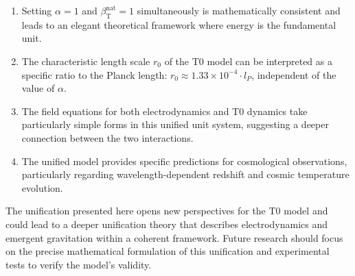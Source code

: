 \documentclass[12pt,a4paper]{article}
\newcommand{\betaT}{\beta_{\text{T}}}
\begin{document}
	\begin{enumerate}
		\item Setting \(\alpha = 1\) and \(\betaT^{\text{nat}} = 1\) simultaneously is mathematically consistent and leads to an elegant theoretical framework where energy is the fundamental unit.
		\item The characteristic length scale \(r_0\) of the T0 model can be interpreted as a specific ratio to the Planck length: \(r_0 \approx 1.33 \times 10^{-4} \cdot l_P\), independent of the value of \(\alpha\).
		\item The field equations for both electrodynamics and T0 dynamics take particularly simple forms in this unified unit system, suggesting a deeper connection between the two interactions.
		\item The unified model provides specific predictions for cosmological observations, particularly regarding wavelength-dependent redshift and cosmic temperature evolution.
	\end{enumerate}
	
	The unification presented here opens new perspectives for the T0 model and could lead to a deeper unification theory that describes electrodynamics and emergent gravitation within a coherent framework. Future research should focus on the precise mathematical formulation of this unification and experimental tests to verify the model’s validity.
	
\end{document}
